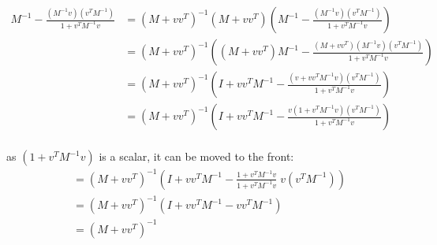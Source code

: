 \begin{align*}
 M^{-1} - \frac{\left(M^{-1}v\right)\left(v^T M^{-1}\right)}{1 + v^T M^{-1} v}
    &= \left(M + vv^T\right)^{-1} \left(M + vv^T\right) \left(M^{-1} - \frac{\left(M^{-1}v\right)\left(v^T M^{-1}\right)}{1 + v^T M^{-1} v}\right) \\
    &= \left(M + vv^T\right)^{-1} \left(\left(M + vv^T\right)M^{-1} - \frac{\left(M + vv^T\right)\left(M^{-1}v\right)\left(v^T M^{-1}\right)}{1 + v^T M^{-1} v}\right) \\
    &= \left(M + vv^T\right)^{-1} \left(I + vv^TM^{-1} - \frac{\left(v + vv^T M^{-1} v\right)\left(v^T M^{-1}\right)}{1 + v^T M^{-1} v}\right) \\
    &= \left(M + vv^T\right)^{-1} \left(I + vv^TM^{-1} - \frac{v\left(1 + v^T M^{-1} v\right)\left(v^T M^{-1}\right)}{1 + v^T M^{-1} v}\right) \\
\end{align*}

as $(1 + v^T M^{-1} v)$ is a scalar, it can be moved to the front:
\begin{align*}
    &= \left(M + vv^T\right)^{-1} \left(I + vv^TM^{-1} - \frac{1 + v^T M^{-1} v}{1 + v^T M^{-1} v} \; v \left(v^T M^{-1}\right)\right) \\
    &= \left(M + vv^T\right)^{-1} \left(I + vv^T M^{-1} - vv^T M^{-1}\right) \\
    &= \left(M + vv^T\right)^{-1}
\end{align*}

